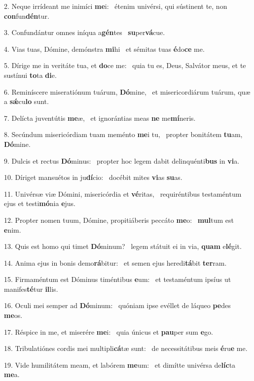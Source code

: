 2. Neque irrídeant me inimíci \textbf{me}i: \ast\  étenim univérsi, qui sústinent te, non \textbf{con}fun\textbf{dén}tur.\

3. Confundántur omnes iníqua a\textbf{gén}tes \ast\  \textbf{su}per\textbf{vá}cue.\

4. Vias tuas, Dómine, demónstra \textbf{mi}hi \ast\  et sémitas tuas \textbf{é}do\textbf{ce} me.\

5. Dírige me in veritáte tua, et \textbf{do}ce me: \ast\  quia tu es, Deus, Salvátor meus, et te sustínui \textbf{to}ta \textbf{di}e.\

6. Reminíscere miseratiónum tuárum, \textbf{Dó}mine, \ast\  et misericordiárum tuárum, quæ a \textbf{sǽ}cu\textbf{lo} sunt.\

7. Delícta juventútis \textbf{me}æ, \ast\  et ignorántias meas \textbf{ne} me\textbf{mí}neris.\

8. Secúndum misericórdiam tuam meménto \textbf{me}i tu, \ast\  propter bonitátem \textbf{tu}am, \textbf{Dó}mine.\

9. Dulcis et rectus \textbf{Dó}minus: \ast\  propter hoc legem dabit delinquénti\textbf{bus} in \textbf{vi}a.\

10. Díriget mansuétos in ju\textbf{dí}cio: \ast\  docébit mites \textbf{vi}as \textbf{su}as.\

11. Univérsæ viæ Dómini, misericórdia et \textbf{vé}ritas, \ast\  requiréntibus testaméntum ejus et testi\textbf{mó}nia \textbf{e}jus.\

12. Propter nomen tuum, Dómine, propitiáberis peccáto \textbf{me}o: \ast\  \textbf{mul}tum est \textbf{e}nim.\

13. Quis est homo qui timet \textbf{Dó}minum? \ast\  legem státuit ei in via, \textbf{quam} e\textbf{lé}git.\

14. Anima ejus in bonis demo\textbf{rá}bitur: \ast\  et semen ejus heredi\textbf{tá}bit \textbf{ter}ram.\

15. Firmaméntum est Dóminus timéntibus \textbf{e}um: \ast\  et testaméntum ipsíus ut manifes\textbf{té}tur \textbf{il}lis.\

16. Oculi mei semper ad \textbf{Dó}minum: \ast\  quóniam ipse evéllet de láqueo \textbf{pe}des \textbf{me}os.\

17. Réspice in me, et miserére \textbf{me}i: \ast\  quia únicus et \textbf{pau}per sum \textbf{e}go.\

18. Tribulatiónes cordis mei multipli\textbf{cá}tæ sunt: \ast\  de necessitátibus meis \textbf{é}ru\textbf{e} me.\

19. Vide humilitátem meam, et labórem \textbf{me}um: \ast\  et dimítte univérsa de\textbf{líc}ta \textbf{me}a.\

